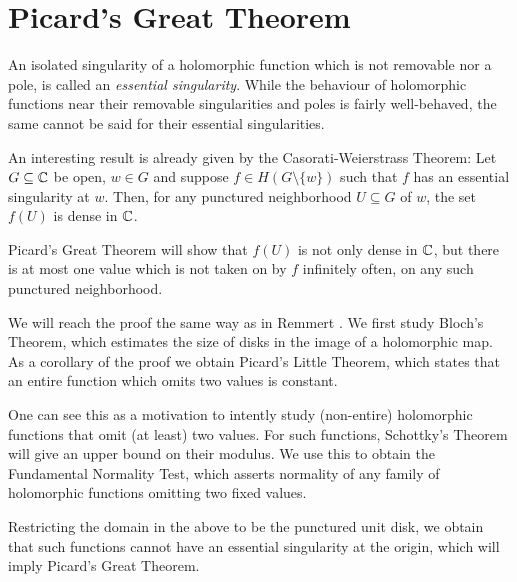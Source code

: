 \chapter{Picard's Great Theorem}
\label{ch:picards-great-theorem}

An isolated singularity of a holomorphic function which is not removable nor a pole, is called an \emph{essential singularity}. While the behaviour of holomorphic functions near their removable singularities and poles is fairly well-behaved, the same cannot be said for their essential singularities.

An interesting result is already given by the Casorati-Weierstrass Theorem: Let $G \subseteq \mathbb{C}$ be open, $w \in G$ and suppose $f \in H(G \setminus \{ w \})$ such that $f$ has an essential singularity at $w$. Then, for any punctured neighborhood $U \subseteq G$ of $w$, the set $f(U)$ is dense in $\mathbb{C}$.

Picard's Great Theorem will show that $f(U)$ is not only dense in $\mathbb{C}$, but there is at most one value which is not taken on by $f$ infinitely often, on any such punctured neighborhood.

We will reach the proof the same way as in Remmert \cite{remmert-function-theory}. We first study Bloch's Theorem, which estimates the size of disks in the image of a holomorphic map. As a corollary of the proof we obtain Picard's Little Theorem, which states that an entire function which omits two values is constant.

One can see this as a motivation to intently study (non-entire) holomorphic functions that omit (at least) two values. For such functions, Schottky's Theorem will give an upper bound on their modulus. We use this to obtain the Fundamental Normality Test, which asserts normality of any family of holomorphic functions omitting two fixed values.

Restricting the domain in the above to be the punctured unit disk, we obtain that such functions cannot have an essential singularity at the origin, which will imply Picard's Great Theorem.




